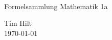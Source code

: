 \begin{titlepage}

  \\ \vspace{3cm}
  
  \begin{center}
    {
      \Huge Formelsammlung Mathematik 1a}
    \vspace{0.5cm}
    
    \begin{Large}
      Tim Hilt\\
      \vspace{0.4cm}
      \today\\
    \end{Large}
    
  \end{center}
\end{titlepage}
\restoregeometry

